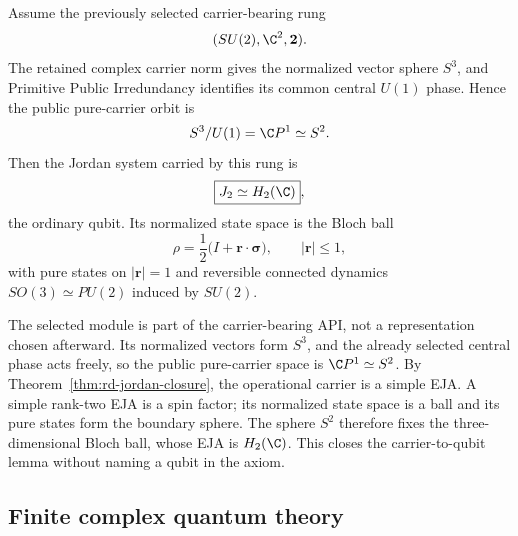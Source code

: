 \begin{theorem}
\label{thm:rd-carrier-to-qubit}
Assume the previously selected carrier-bearing rung
\[
 (SU(2),\C^2,\mathbf2).
\]
The retained complex carrier norm gives the normalized vector sphere $S^3$, and
Primitive Public Irredundancy identifies its common central $U(1)$ phase.  Hence the
public pure-carrier orbit is
\[
 S^3/U(1)=\C P^1\simeq S^2.
\]
Then the Jordan system carried by this rung is
\[
 \boxed{J_2\simeq H_2(\C)},
\]
the ordinary qubit.  Its normalized state space is the Bloch ball
\[
 \rho
 =
 \frac12\bigl(I+\mathbf r\cdot\boldsymbol\sigma\bigr),
 \qquad
 |\mathbf r|\le1,
\]
with pure states on $|\mathbf r|=1$ and reversible connected dynamics
$SO(3)\simeq PU(2)$ induced by $SU(2)$.
\end{theorem}

\begin{proofsketch}
The selected module is part of the carrier-bearing API, not a representation chosen
afterward.  Its normalized vectors form $S^3$, and the already selected central phase
acts freely, so the public pure-carrier space is $\C P^1\simeq S^2$.  By
Theorem~\ref{thm:rd-jordan-closure}, the operational carrier is a simple EJA.  A simple rank-two EJA is a spin factor; its normalized state
space is a ball and its pure states form the boundary sphere.  The sphere $S^2$
therefore fixes the three-dimensional Bloch ball, whose EJA is
$H_2(\C)$.  This closes the carrier-to-qubit lemma without naming a qubit in the
axiom.
\end{proofsketch}

\subsection{Finite complex quantum theory}

